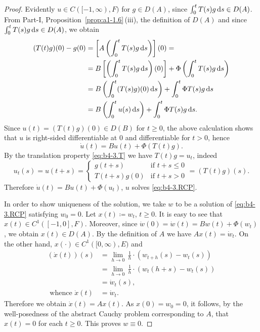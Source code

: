 \begin{proof} Evidently $u \in C([-1,\infty),F)$ for $g \in D(A)$,
since $\int_{0}^{t} T(s)g \mathop{}\!\mathrm{d}{s}  \in D(A)$.
From Part-I, Proposition~\ref{prop:a1-1.6}\,(iii), the definition of\/ $D(A)$ and since $\int_{0}^{t} T(s)g \mathop{}\!\mathrm{d}{s}  \in D(A)$, we obtain
\begin{align*}
	(T(t)g)(0) - g(0) &= \left[A\left(\int_{0}^{t} T(s)g  \mathop{}\!\mathrm{d}{s} \right)\right](0) = \\
	&= B\left[\left(\int_{0}^{t} T(s)g \mathop{}\!\mathrm{d}{s}\right)(0)\right] + \Phi\left(\int_{0}^{t} T(s)g \mathop{}\!\mathrm{d}{s} \right) \\
	&= B\left(\int_{0}^{t} (T(s)g)(0) \mathop{}\!\mathrm{d}{s}\right) + \int_{0}^{t} \Phi T(s)g \mathop{}\!\mathrm{d}{s}  \\
	&= B\left(\int_{0}^{t} u(s) \mathop{}\!\mathrm{d}{s}\right)  + \int_{0}^{t} \Phi T(s)g \mathop{}\!\mathrm{d}{s} .
\end{align*}
Since $u(t) = (T(t)g)(0) \in D(B)$ for $t \geq 0$, the above calculation shows that $u$ is right-sided differentiable at $0$ and differentiable for $t > 0$, hence
\[
\dot{u}(t) = Bu(t) + \Phi(T(t)g) .
\]
By the translation property \eqref{eq:b4-3.T} we have $T(t)g = u_t$, indeed
\[
u_t(s) = u(t+s) = 
\begin{cases}
	g(t+s) & \text{if } t+s \leq 0 \\
	T(t+s)g(0) & \text{if } t+s > 0
\end{cases}
= (T(t)g)(s) .
\]
Therefore $\dot{u}(t) = Bu(t) + \Phi(u_t)$, \ie $u$ solves \eqref{eq:b4-3.RCP}.

In order to show uniqueness of the solution, we take $w$ to be a solution of  \eqref{eq:b4-3.RCP} satisfying $w_{0} = 0$. 
Let $x(t) \coloneq  w_t$, $t \geq 0$. 
It is easy to see that $x(t) \in C^1([-1,0],F)$. Moreover, since $\dot{w}(0) = \dot{w}(t) = Bw(t) + \Phi(w_t)$, we obtain $x(t) \in D(A)$. 
By the definition of\/ $A$ we have $Ax(t) = \dot{w}_t$. 
On the other hand, $x(\cdot) \in C^1([0,\infty),E)$ and
\begin{align*}
(\dot{x}(t))(s)
    &= \lim_{h \to 0} \,\frac{1}{h} \cdot (w_{t+h}(s) - w_t(s)) \\
    &= \lim_{h \to 0} \,\frac{1}{h} \cdot (w_t(h+s) - w_t(s)) \\
    &= \dot{w}_t(s), \\
    \text{ whence } \dot{x}(t) &= \dot{w}_t .
\end{align*}
Therefore we obtain $\dot{x}(t) = Ax(t)$. 
As $x(0) = w_{0} = 0$, it follows, by the well-posedness of the abstract Cauchy problem corresponding to $A$,  that $x(t) = 0$ for each $t \geq 0$. 
This proves $w \equiv 0$.
\end{proof}

